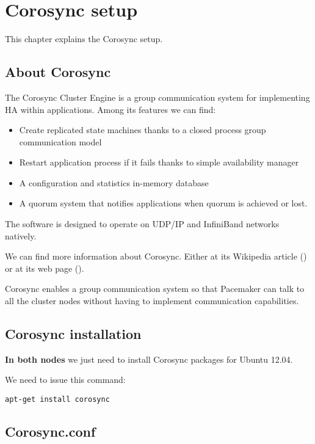 

\chapter{Corosync setup}
\label{chap:corosync-setup}
This chapter explains the Corosync setup.

\section {About Corosync}
The Corosync Cluster Engine is a group communication system for implementing HA within applications. Among its features we can find:
\begin{itemize}
  \item Create replicated state machines thanks to a closed process group communication model
  \item Restart application process if it fails thanks to simple availability manager
  \item A configuration and statistics in-memory database
  \item A quorum system that notifies applications when quorum is achieved or lost.
\end{itemize}


The software is designed to operate on UDP/IP and InfiniBand networks natively.

We can find more information about Corosync. Either at its Wikipedia article (\cite{WikipediaCorosync}) or at its web page (\cite{CorosyncWebpage}).

Corosync enables a group communication system so that Pacemaker can talk to all the cluster nodes without having to implement communication capabilities.

\section {Corosync installation}
\textbf{In both nodes} we just need to install Corosync packages for Ubuntu 12.04.

We need to issue this command:
\begin{verbatim}
apt-get install corosync
\end{verbatim}


\section {Corosync.conf}

